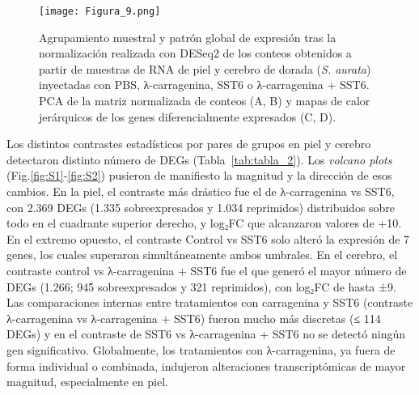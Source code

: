 \documentclass[10pt,a4paper]{article}
\begin{document}
\begin{figure}[ht]
  \centering
 \texttt{[image: Figura\_9.png]}
 
  \caption{Agrupamiento muestral y patrón global de expresión tras la normalización realizada con DESeq2 de los conteos obtenidos a partir de muestras de RNA de piel y cerebro de dorada (\textit{S. aurata}) inyectadas con PBS, λ-carragenina, SST6 o λ-carragenina + SST6. PCA de la matriz normalizada de conteos (A, B) y mapas de calor jerárquicos de los genes diferencialmente expresados (C, D).}
  \label{fig:9}
\end{figure}

Los distintos contrastes estadísticos por pares de grupos en piel y cerebro detectaron distinto número de DEGs (Tabla~\ref{tab:tabla_2}). Los \textit{volcano plots} (Fig.\ref{fig:S1}-\ref{fig:S2}) pusieron de manifiesto la magnitud y la dirección de esos cambios. En la piel, el contraste más drástico fue el de λ-carragenina vs SST6, con 2.369 DEGs (1.335 sobreexpresados y 1.034 reprimidos) distribuidos sobre todo en el cuadrante superior derecho, y log₂FC que alcanzaron valores de +10. En el extremo opuesto, el contraste Control vs SST6 solo alteró la expresión de 7 genes, los cuales superaron simultáneamente ambos umbrales. En el cerebro, el contraste control vs λ-carragenina + SST6 fue el que generó el mayor número de DEGs (1.266; 945 sobreexpresados y 321 reprimidos), con log₂FC de hasta ±9. Las comparaciones internas entre tratamientos con carragenina y SST6 (contraste λ-carragenina vs λ-carragenina + SST6) fueron mucho más discretas (≤ 114 DEGs) y en el contraste de SST6 vs λ-carragenina + SST6 no se detectó ningún gen significativo. Globalmente, los tratamientos con λ-carragenina, ya fuera de forma individual o combinada, indujeron alteraciones transcriptómicas de mayor magnitud, especialmente en piel.
\end{document}

